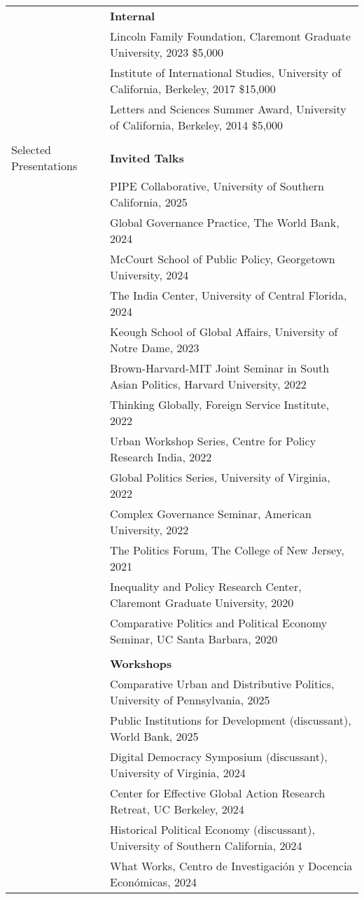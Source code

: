 \documentclass[letterpaper, 10.5pt]{article}
\begin{document}
\begin{longtable}{p{1.5in}p{5in}}
& \textbf{Internal}\\

& Lincoln Family Foundation, Claremont Graduate University, 2023 \hfill \$5,000\\


&Institute of International Studies, University of California, Berkeley, 2017 \hfill \$15,000  \\
& Letters and Sciences Summer Award, University of California, Berkeley, 2014 \hfill \$5,000\\
& \\





{{Selected Presentations}} & \textbf{Invited Talks}\\
& PIPE Collaborative, University of Southern California, 2025\\
&Global Governance Practice, The World Bank,  2024\\

&McCourt School of Public Policy, Georgetown University, 2024\\
& The India Center, University of Central Florida, 2024\\
&Keough School of Global Affairs, University of Notre Dame, 2023\\
 &Brown-Harvard-MIT Joint Seminar in South Asian Politics, Harvard University, 2022\\
  &Thinking Globally, Foreign Service Institute, 2022 \\
 &Urban Workshop Series, Centre for Policy Research India, 2022\\

 &Global Politics Series, University of Virginia, 2022\\
&Complex Governance Seminar, American University, 2022\\
&The Politics Forum, The College of New Jersey, 2021\\
 &Inequality and Policy Research Center, Claremont Graduate University, 2020\\
 & Comparative Politics and Political Economy Seminar, UC Santa Barbara, 2020\\
&\\
& \textbf{Workshops}\\ 
& Comparative Urban and Distributive Politics, University of Pennsylvania, 2025\\
& Public Institutions for Development (discussant), World Bank, 2025\\
& Digital Democracy Symposium (discussant), University of Virginia, 2024\\
& Center for Effective Global Action Research Retreat, UC Berkeley, 2024\\
& Historical Political Economy (discussant), University of Southern California, 2024\\
&What Works, Centro de Investigaci\'{o}n y Docencia Econ\'{o}micas, 2024\\



\end{longtable}
\end{document}
